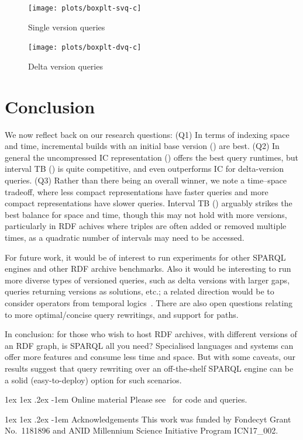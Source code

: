 \documentclass{llncs}
\makeatletter
\renewcommand\paragraph{\@startsection{paragraph}{4}{\z@}%
	{1ex \@plus1ex \@minus.2ex}%
	{-1em}%
	{\normalfont\normalsize\itshape}}
\makeatother
\begin{document}
\begin{figure}[t]
\centering
\begin{minipage}{.5\textwidth}
  \centering
  \texttt{[image: plots/boxplt-svq-c]}
  \caption{Single version queries  \label{fig:svq}}
\end{minipage}%
\hfill
\begin{minipage}{.5\textwidth}
  \centering
  \texttt{[image: plots/boxplt-dvq-c]}
  \caption{Delta version queries   \label{fig:dvq}}
\end{minipage}
\end{figure}

\section{Conclusion}

We now reflect back on our research questions: (Q1) In terms of indexing space and time, incremental builds with an initial base version (\cbpd) are best. (Q2) In general the uncompressed IC representation (\ic) offers the best query runtimes, but interval TB (\tb) is quite competitive, and even outperforms IC for delta-version queries. (Q3) Rather than there being an overall winner, we note a time--space tradeoff, where less compact representations have faster queries and more compact representations have slower queries. Interval TB (\tb) arguably strikes the best balance for space and time, though this may not hold with more versions, particularly in RDF achives where triples are often added or removed multiple times, as a quadratic number of intervals may need to be accessed.

For future work, it would be of interest to run experiments for other SPARQL engines and other RDF archive benchmarks. Also it would be interesting to run more diverse types of versioned queries, such as delta versions with larger gaps, queries returning versions as solutions, etc.; a related direction would be to consider operators from temporal logics~\cite{Pnueli77}. There are also open questions relating to more optimal/concise query rewritings, and support for paths.

In conclusion: for those who wish to host RDF archives, with different versions of an RDF graph, is SPARQL all you need? Specialised languages and systems can offer more features and consume less time and space. But with some caveats, our results suggest that query rewriting over an off-the-shelf SPARQL engine can be a solid (easy-to-deploy) option for such scenarios.

\paragraph{Online material} Please see~\cite{online} for code and queries.

\paragraph{Acknowledgements} This work was funded by Fondecyt Grant No.\ 1181896 and ANID Millennium Science Initiative Program ICN17\_002.



\end{document}
